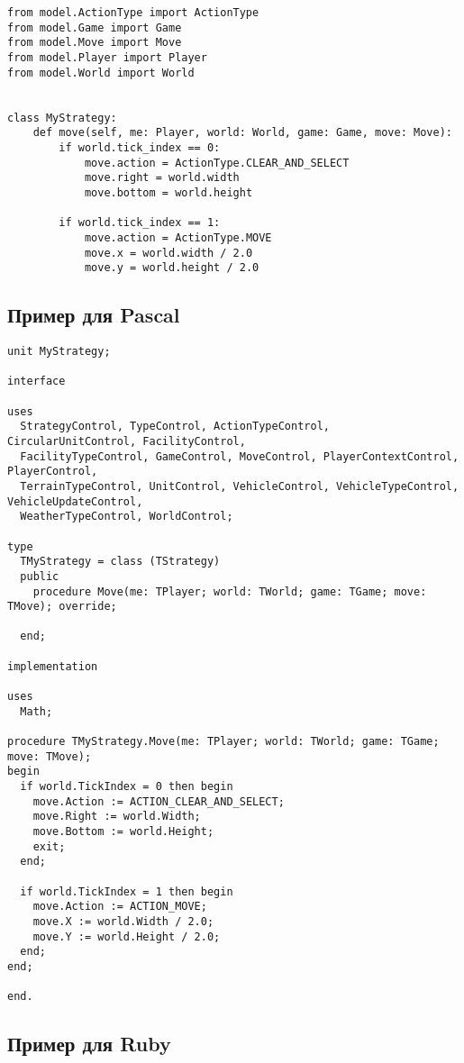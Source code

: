 \begin{verbatim}
from model.ActionType import ActionType
from model.Game import Game
from model.Move import Move
from model.Player import Player
from model.World import World


class MyStrategy:
    def move(self, me: Player, world: World, game: Game, move: Move):
        if world.tick_index == 0:
            move.action = ActionType.CLEAR_AND_SELECT
            move.right = world.width
            move.bottom = world.height

        if world.tick_index == 1:
            move.action = ActionType.MOVE
            move.x = world.width / 2.0
            move.y = world.height / 2.0
\end{verbatim}

\newpage
\subsection{Пример для Pascal}

\begin{verbatim}
unit MyStrategy;

interface

uses
  StrategyControl, TypeControl, ActionTypeControl, CircularUnitControl, FacilityControl,
  FacilityTypeControl, GameControl, MoveControl, PlayerContextControl, PlayerControl,
  TerrainTypeControl, UnitControl, VehicleControl, VehicleTypeControl, VehicleUpdateControl,
  WeatherTypeControl, WorldControl;

type
  TMyStrategy = class (TStrategy)
  public
    procedure Move(me: TPlayer; world: TWorld; game: TGame; move: TMove); override;

  end;

implementation

uses
  Math;
    
procedure TMyStrategy.Move(me: TPlayer; world: TWorld; game: TGame; move: TMove);
begin
  if world.TickIndex = 0 then begin
    move.Action := ACTION_CLEAR_AND_SELECT;
    move.Right := world.Width;
    move.Bottom := world.Height;
    exit;
  end;

  if world.TickIndex = 1 then begin
    move.Action := ACTION_MOVE;
    move.X := world.Width / 2.0;
    move.Y := world.Height / 2.0;
  end;
end;

end.
\end{verbatim}

\newpage
\subsection{Пример для Ruby}

